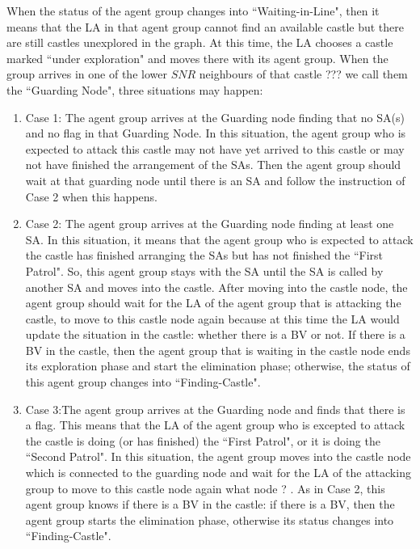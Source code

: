 When the status of the agent group changes into ``Waiting-in-Line", then it means that the  LA in that agent group cannot find an available castle but there are still castles unexplored in the graph. At this time, the LA    chooses a castle marked ``under exploration" and moves there with its agent group. When the   group arrives in one of the lower $SNR$ neighbours of that castle \color{blue}  ??? we call them the ``Guarding Node", \color{black} three situations may happen:
\begin{enumerate}
\item Case 1: The agent group arrives at the Guarding node finding that no SA(s) and no flag in that  Guarding Node. In this situation, the agent group who is expected to attack this castle may not have yet arrived to this castle or may not have  finished the arrangement of the SAs. Then the agent group should wait at that guarding node until there is an SA and   follow  the instruction of Case 2 when this happens.  

\item Case 2: The agent group arrives at the Guarding node finding at least one SA. In this situation, it means that the agent group who is expected to attack the castle has finished arranging the SAs but has not finished the ``First Patrol". So, this agent group stays with the SA until the SA is called by another SA and moves into the castle. After moving into the castle node, the agent group should wait for the LA of the agent group that is attacking the castle, to move to this castle node again because at this time the LA would update the situation in the castle: whether there is a BV or not. If there is a BV in the castle, then the agent group that is waiting in the castle node ends its exploration phase and start the elimination phase; otherwise,   the status of this agent group changes into ``Finding-Castle".

\item Case 3:The agent group arrives at the Guarding node and finds that there is a flag. This means that the LA of the agent group who is excepted to attack the castle is doing (or has finished) the ``First Patrol", or it is doing the   ``Second Patrol". In this situation, the agent group moves into the castle node which is connected to the guarding node   and wait  for the LA of the attacking   group  to move to this castle node again \color{blue} what node ? \color{black}. As in Case 2, this agent group  knows   if there is a BV in the castle:  if there is a BV, then the agent group starts the elimination phase, otherwise its status  changes into ``Finding-Castle".
\end{enumerate}


